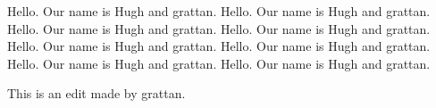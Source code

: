 \documentclass{grattanAlpha}
\begin{document}
Hello. Our name is Hugh and grattan. Hello. Our name is Hugh and grattan. Hello. Our name is Hugh and grattan. Hello. Our name is Hugh and grattan. Hello. Our name is Hugh and grattan. Hello. Our name is Hugh and grattan. Hello. Our name is Hugh and grattan. Hello. Our name is Hugh and grattan.


This is an edit made by grattan.
\end{document}
